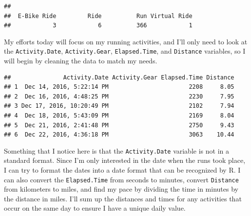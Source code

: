 \documentclass[]{article}
\newenvironment{Shaded}{\begin{snugshade}}{\end{snugshade}}
\newcommand{\CommentTok}[1]{\textcolor[rgb]{0.56,0.35,0.01}{\textit{#1}}}
\newcommand{\KeywordTok}[1]{\textcolor[rgb]{0.13,0.29,0.53}{\textbf{#1}}}
\newcommand{\NormalTok}[1]{#1}
\newcommand{\OperatorTok}[1]{\textcolor[rgb]{0.81,0.36,0.00}{\textbf{#1}}}
\newcommand{\StringTok}[1]{\textcolor[rgb]{0.31,0.60,0.02}{#1}}
\begin{document}
\begin{Shaded}
\end{Shaded}

\begin{verbatim}
## 
##  E-Bike Ride         Ride          Run Virtual Ride 
##            3            6          366            1
\end{verbatim}

My efforts today will focus on my running activities, and I'll only need
to look at the \texttt{Activity.Date}, \texttt{Activity.Gear},
\texttt{Elapsed.Time}, and \texttt{Distance} variables, so I will begin
by cleaning the data to match my needs.

\begin{Shaded}
\end{Shaded}

\begin{verbatim}
##               Activity.Date Activity.Gear Elapsed.Time Distance
## 1  Dec 14, 2016, 5:22:14 PM                       2208     8.05
## 2  Dec 16, 2016, 4:48:25 PM                       2230     7.95
## 3 Dec 17, 2016, 10:20:49 PM                       2102     7.94
## 4  Dec 18, 2016, 5:43:09 PM                       2169     8.04
## 5  Dec 21, 2016, 2:41:48 PM                       2750     9.43
## 6  Dec 22, 2016, 4:36:18 PM                       3063    10.44
\end{verbatim}

Something that I notice here is that the \texttt{Activity.Date} variable
is not in a standard format. Since I'm only interested in the date when
the runs took place, I can try to format the dates into a date format
that can be recognized by R. I can also convert the
\texttt{Elapsed.Time} from seconds to minutes, convert \texttt{Distance}
from kilometers to miles, and find my pace by dividing the time in
minutes by the distance in miles. I'll sum up the distances and times
for any activities that occur on the same day to ensure I have a unique
daily value.
\end{document}
